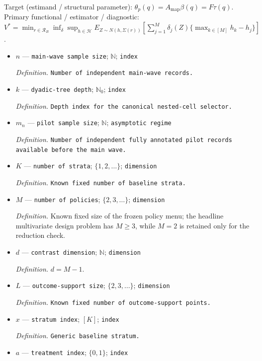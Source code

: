 \documentclass{article}
\begin{document}
Target (estimand / structural parameter): \(\theta_p(q)=A_{\mathrm{map}}\beta(q)=F\tau(q)\).
Primary functional / estimator / diagnostic: \(V^*=\min_{r\in\mathcal R_B}\inf_\delta\sup_{h\in\mathcal H}E_{Z\sim N(h,\Sigma(r))}[\sum_{j=1}^{M}\delta_j(Z)\{\max_{k\in[M]}h_k-h_j\}]\).
\begin{itemize}
  \item \(n\) --- \texttt{main-\allowbreak{}wave sample size}; \(\mathbb N\); \texttt{index}
  \par\smallskip\noindent\emph{Definition.} \texttt{Number of independent main-\allowbreak{}wave records.}
  \item \(k\) --- \texttt{dyadic-\allowbreak{}tree depth}; \(\mathbb N_0\); \texttt{index}
  \par\smallskip\noindent\emph{Definition.} \texttt{Depth index for the canonical nested-\allowbreak{}cell selector.}
  \item \(m_n\) --- \texttt{pilot sample size}; \(\mathbb N\); \texttt{asymptotic regime}
  \par\smallskip\noindent\emph{Definition.} \texttt{Number of independent fully annotated pilot records available before the main wave.}
  \item \(K\) --- \texttt{number of strata}; \(\{1,2,\ldots\}\); \texttt{dimension}
  \par\smallskip\noindent\emph{Definition.} \texttt{Known fixed number of baseline strata.}
  \item \(M\) --- \texttt{number of policies}; \(\{2,3,\ldots\}\); \texttt{dimension}
  \par\smallskip\noindent\emph{Definition.} Known fixed size of the frozen policy menu; the headline multivariate design problem has \(M\ge3\), while \(M=2\) is retained only for the reduction check.
  \item \(d\) --- \texttt{contrast dimension}; \(\mathbb N\); \texttt{dimension}
  \par\smallskip\noindent\emph{Definition.} \(d=M-1\).
  \item \(L\) --- \texttt{outcome-\allowbreak{}support size}; \(\{2,3,\ldots\}\); \texttt{dimension}
  \par\smallskip\noindent\emph{Definition.} \texttt{Known fixed number of outcome-\allowbreak{}support points.}
  \item \(x\) --- \texttt{stratum index}; \([K]\); \texttt{index}
  \par\smallskip\noindent\emph{Definition.} \texttt{Generic baseline stratum.}
  \item \(a\) --- \texttt{treatment index}; \(\{0,1\}\); \texttt{index}

\end{itemize}
\end{document}
